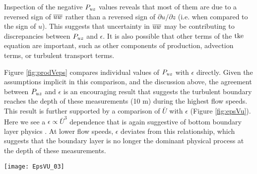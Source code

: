 Inspection of the negative $P_{uz}$ values reveals that most of them are due to a reversed sign of $\overline{uw}$ rather than a reversed sign of $\partial u / \partial z$ (i.e. when compared to the sign of $u$). This suggests that uncertainty in $\overline{uw}$ may be contributing to discrepancies between $P_{uz}$ and $\epsilon$. It is also possible that other terms of the $\mathrm{tke}$ equation are important, such as other components of production, advection terms, or turbulent transport terms.

Figure \ref{fig:prodVeps} compares individual values of $P_{uz}$ with $\epsilon$ directly. Given the assumptions implicit in this comparison, and the discussion above, the agreement between $P_{uz}$ and $\epsilon$ is an encouraging result that suggests the turbulent boundary reaches the depth of these measurements (10 m) during the highest flow speeds. This result is further supported by a comparison of $\bar{U}$ with $\epsilon$ (Figure \ref{fig:epsVu}). Here we see a $\epsilon \propto \bar{U}^3$ dependence that is again suggestive of bottom boundary layer physics \citep[]{Trowbridge1992,Nash++2009}. At lower flow speeds, $\epsilon$ deviates from this relationship, which suggests that the boundary layer is no longer the dominant physical process at the depth of these measurements.


\begin{figure*}[t]
  \centering
  \texttt{[image: EpsVU\_03]}
  \caption{A log-log plot of $\epsilon$ versus $\bar{U}$ for the June 2014 TTM (diamonds) and May 2015 StableMoor (dots) deployments, during ebb (left) and flood (right). Black points are 5 minute averages.  Green dots are mean values within speed bins of 0.2 m s$^{-1}$ width that have at least 10 points (50 minutes of data); their vertical bars are 95\% bootstrap confidence intervals. The blue line shows a $U^3$ slope, where the proportionality constant (blue box) is calculated by taking the log-space mean of $\epsilon/U^3$. }
  \label{fig:epsVu}
\end{figure*}



